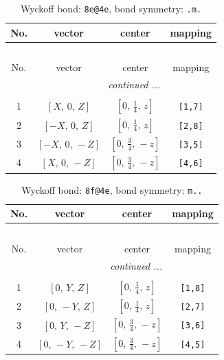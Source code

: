\documentclass[fleqn,8pt]{jsarticle}
\begin{document}
\renewcommand{\arraystretch}{1.2}
\begin{longtable}{cccc}
\caption{Wyckoff bond: {\tt 8e@4e}, bond symmetry: {\tt .m.}}
 \\
 \hline \hline
No. & vector & center & mapping \\ \hline \endfirsthead

\multicolumn{3}{l}{\tablename\ \thetable{}} \\
 \hline \hline
No. & vector & center & mapping \\ \hline \endhead

 \hline \hline
\multicolumn{3}{r}{\footnotesize\it continued ...} \\ \endfoot

 \hline \hline
\multicolumn{3}{r}{} \\ \endlastfoot

1 & $\left[ X,\, 0,\, Z \right]$ & $\left[ 0,\, \frac{1}{4},\, z \right]$ & {\tt [1,7]} \\ \hline
2 & $\left[ - X,\, 0,\, Z \right]$ & $\left[ 0,\, \frac{1}{4},\, z \right]$ & {\tt [2,8]} \\ \hline
3 & $\left[ - X,\, 0,\, - Z \right]$ & $\left[ 0,\, \frac{3}{4},\, - z \right]$ & {\tt [3,5]} \\ \hline
4 & $\left[ X,\, 0,\, - Z \right]$ & $\left[ 0,\, \frac{3}{4},\, - z \right]$ & {\tt [4,6]} \\
\end{longtable}
\renewcommand{\arraystretch}{1.2}
\begin{longtable}{cccc}
\caption{Wyckoff bond: {\tt 8f@4e}, bond symmetry: {\tt m..}}
 \\
 \hline \hline
No. & vector & center & mapping \\ \hline \endfirsthead

\multicolumn{3}{l}{\tablename\ \thetable{}} \\
 \hline \hline
No. & vector & center & mapping \\ \hline \endhead

 \hline \hline
\multicolumn{3}{r}{\footnotesize\it continued ...} \\ \endfoot

 \hline \hline
\multicolumn{3}{r}{} \\ \endlastfoot

1 & $\left[ 0,\, Y,\, Z \right]$ & $\left[ 0,\, \frac{1}{4},\, z \right]$ & {\tt [1,8]} \\ \hline
2 & $\left[ 0,\, - Y,\, Z \right]$ & $\left[ 0,\, \frac{1}{4},\, z \right]$ & {\tt [2,7]} \\ \hline
3 & $\left[ 0,\, Y,\, - Z \right]$ & $\left[ 0,\, \frac{3}{4},\, - z \right]$ & {\tt [3,6]} \\ \hline
4 & $\left[ 0,\, - Y,\, - Z \right]$ & $\left[ 0,\, \frac{3}{4},\, - z \right]$ & {\tt [4,5]} \\
\end{longtable}
\end{document}
